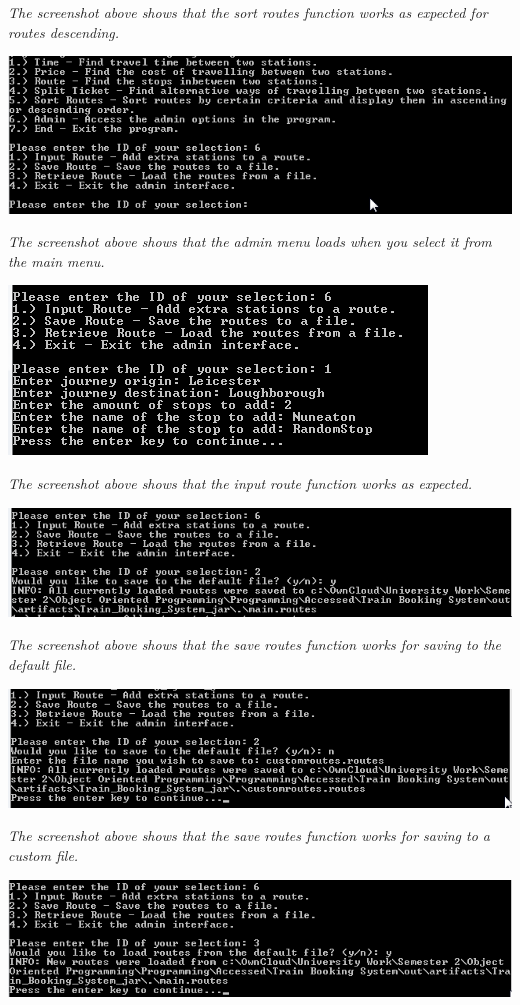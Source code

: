 \documentclass[10pt, a4paper]{article}
\begin{document}
\textit{The screenshot above shows that the sort routes function works as expected for routes descending.}

\includegraphics{Functionality13.png}

\textit{The screenshot above shows that the admin menu loads when you select it from the main menu.}

\includegraphics{Functionality14.png}

\textit{The screenshot above shows that the input route function works as expected.}

\includegraphics{Functionality15.png}

\textit{The screenshot above shows that the save routes function works for saving to the default file.}

\includegraphics{Functionality16.png}

\textit{The screenshot above shows that the save routes function works for saving to a custom file.}

\includegraphics{Functionality17.png}
\end{document}
